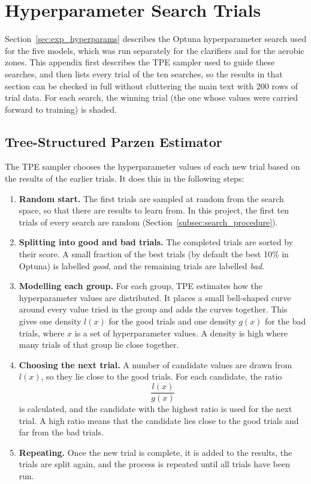 \chapter{Hyperparameter Search Trials}{}
\makeatletter{}\makeatother
\label{appen:hyperparam_trials}

Section~\ref{sec:exp_hyperparams} describes the Optuna hyperparameter search used for the five models, which was run separately for the clarifiers and for the aerobic zones. This appendix first describes the TPE sampler used to guide these searches, and then lists every trial of the ten searches, so the results in that section can be checked in full without cluttering the main text with 200 rows of trial data. For each search, the winning trial (the one whose values were carried forward to training) is shaded.

\section{Tree-Structured Parzen Estimator}
\label{sec:appen_tpe}

The TPE sampler \citep{bergstra2011tpe} chooses the hyperparameter values of each new trial based on the results of the earlier trials. It does this in the following steps:

\begin{enumerate}
    \item \textbf{Random start.} The first trials are sampled at random from the search space, so that there are results to learn from. In this project, the first ten trials of every search are random (Section~\ref{subsec:search_procedure}).
    \item \textbf{Splitting into good and bad trials.} The completed trials are sorted by their score. A small fraction of the best trials (by default the best 10\% in Optuna) is labelled \emph{good}, and the remaining trials are labelled \emph{bad}.
    \item \textbf{Modelling each group.} For each group, TPE estimates how the hyperparameter values are distributed. It places a small bell-shaped curve around every value tried in the group and adds the curves together. This gives one density $l(x)$ for the good trials and one density $g(x)$ for the bad trials, where $x$ is a set of hyperparameter values. A density is high where many trials of that group lie close together.
    \item \textbf{Choosing the next trial.} A number of candidate values are drawn from $l(x)$, so they lie close to the good trials. For each candidate, the ratio
    \begin{equation}
        \frac{l(x)}{g(x)}
    \end{equation}
    is calculated, and the candidate with the highest ratio is used for the next trial. A high ratio means that the candidate lies close to the good trials and far from the bad trials.
    \item \textbf{Repeating.} Once the new trial is complete, it is added to the results, the trials are split again, and the process is repeated until all trials have been run.
\end{enumerate}

